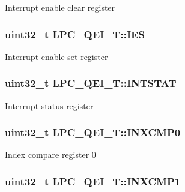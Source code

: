 Interrupt enable clear register \hypertarget{structLPC__QEI__T_a2eab592cbea507455a7aaab9a5ab6d53}{
\subsubsection[{I\-E\-S}]{ uint32\-\_\-t L\-P\-C\-\_\-\-Q\-E\-I\-\_\-\-T\-::\-I\-E\-S}}\label{structLPC__QEI__T_a2eab592cbea507455a7aaab9a5ab6d53}
Interrupt enable set register \hypertarget{structLPC__QEI__T_a550a4e26c5e38589e8722dc3064478a5}{
\subsubsection[{I\-N\-T\-S\-T\-A\-T}]{ uint32\-\_\-t L\-P\-C\-\_\-\-Q\-E\-I\-\_\-\-T\-::\-I\-N\-T\-S\-T\-A\-T}}\label{structLPC__QEI__T_a550a4e26c5e38589e8722dc3064478a5}
Interrupt status register \hypertarget{structLPC__QEI__T_abb45974ac42d27676c2b3c08d9f9aad0}{
\subsubsection[{I\-N\-X\-C\-M\-P0}]{ uint32\-\_\-t L\-P\-C\-\_\-\-Q\-E\-I\-\_\-\-T\-::\-I\-N\-X\-C\-M\-P0}}\label{structLPC__QEI__T_abb45974ac42d27676c2b3c08d9f9aad0}
Index compare register 0 \hypertarget{structLPC__QEI__T_a69a6150f42d9c8f9ed52c305c72bd72f}{
\subsubsection[{I\-N\-X\-C\-M\-P1}]{ uint32\-\_\-t L\-P\-C\-\_\-\-Q\-E\-I\-\_\-\-T\-::\-I\-N\-X\-C\-M\-P1}}\label{structLPC__QEI__T_a69a6150f42d9c8f9ed52c305c72bd72f}
